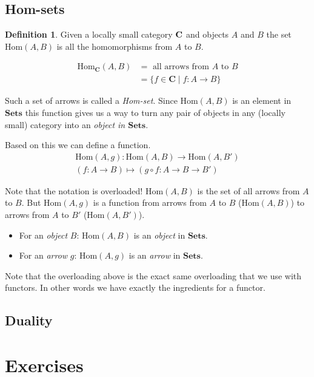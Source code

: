 \documentclass{book}
\theoremstyle{definition}
\newtheorem{definition}{Definition}[section]
\newcommand\Hom{\text{Hom}}
\begin{document}
\section{Hom-sets}

\begin{definition}
  Given a locally small category $\bf{C}$ and objects $A$ and $B$ the set
  $\Hom(A, B)$ is all the homomorphisms from $A$ to $B$.

  \begin{align*}
    \Hom_{\mathbf{C}}(A, B) &= \text{ all arrows from } A \text{ to } B \\
                          &= \{ f \in \mathbf{C} \mid f : A \rightarrow B \}
  \end{align*}
\end{definition}

Such a set of arrows is called a \emph{Hom-set}. Since $\Hom(A, B)$ is an
element in $\mathbf{Sets}$ this function gives us a way to turn any pair of
objects in any (locally small) category into an \emph{object in
  $\mathbf{Sets}$}.

Based on this we can define a function.
\begin{align*}
  \Hom(A, g) : \Hom(A, B) \to \Hom(A, B') \\
  (f : A \to B) \mapsto (g \circ f : A \to B \to B')
\end{align*}

Note that the notation is overloaded! $\Hom(A, B)$ is the set of all arrows from
$A$ to $B$. But $\Hom(A, g)$ is a function from arrows from $A$ to $B$
($\Hom(A, B)$) to arrows from $A$ to $B'$ ($\Hom(A, B')$).

\begin{itemize}
\item For an \emph{object} $B$: $\Hom(A, B)$ is an \emph{object} in $\mathbf{Sets}$.
\item For an \emph{arrow} $g$: $\Hom(A, g)$ is an \emph{arrow} in $\mathbf{Sets}$.
\end{itemize}

Note that the overloading above is the exact same overloading that we use with
functors. In other words we have exactly the ingredients for a functor.

\section{Duality}



\chapter{Exercises}
\end{document}
